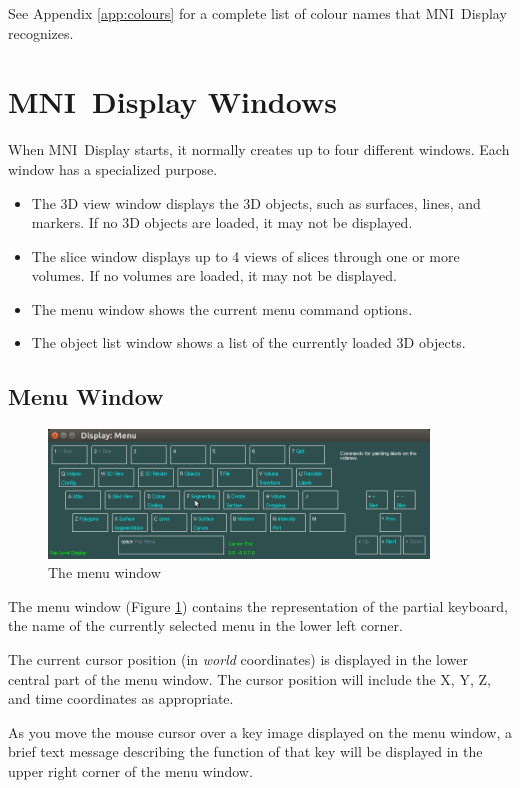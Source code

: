 \documentclass[11pt,letterpaper]{article}
\newcommand{\display}{\mbox{MNI Display}}
\begin{document}
See Appendix \ref{app:colours} for a complete list of colour names that
\display{} recognizes.

\section{\display{} Windows}
When \display{} starts, it normally creates up to four different
windows. Each window has a specialized purpose.

\begin{itemize}
\item The 3D view window displays the 3D objects, such as surfaces, lines,
and markers. If no 3D objects are loaded, it may not be displayed.
\item The slice window displays up to 4 views of slices through one or more 
volumes. If no volumes are loaded, it may not be displayed.
\item The menu window shows the current menu command options.
\item The object list window shows a list of the currently loaded 3D objects.
\end{itemize}

\subsection{Menu Window}

\begin{figure}
\centering
\includegraphics[width=0.9\textwidth]{display-top-menu.png}
\caption{The menu window}
\label{winMenu}
\end{figure}

The menu window (Figure \ref{winMenu}) contains the representation of
the partial keyboard, the name of the currently selected menu in the
lower left corner.

The current cursor position (in {\em world} coordinates) is displayed
in the lower central part of the menu window. The cursor position will
include the X, Y, Z, and time coordinates as appropriate.

As you move the mouse cursor over a key image displayed on the menu
window, a brief text message describing the function of that key will
be displayed in the upper right corner of the menu window.
\end{document}
